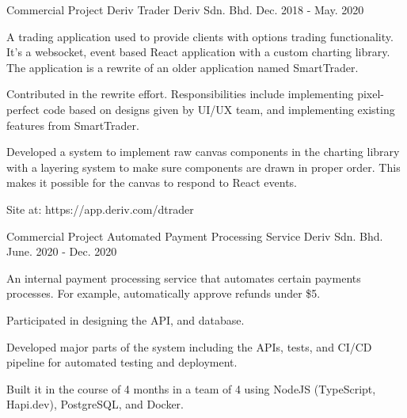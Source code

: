 

\begin{cventries}

  \cventry
    {Commercial Project} %
    {Deriv Trader} %
    {Deriv Sdn. Bhd.} %
    {Dec. 2018 - May. 2020} %
    {
      \begin{cvitems} %
        \item {A trading application used to provide clients with options trading functionality. It's a websocket, event based React application with a custom charting library. The application is a rewrite of an older application named SmartTrader.}
        \item {Contributed in the rewrite effort. Responsibilities include implementing pixel-perfect code based on designs given by UI/UX team, and implementing existing features from SmartTrader.}
        \item {Developed a system to implement raw canvas components in the charting library with a layering system to make sure components are drawn in proper order. This makes it possible for the canvas to respond to React events.}
        \item {Site at: https://app.deriv.com/dtrader}
      \end{cvitems}
    }

  \cventry
    {Commercial Project} %
    {Automated Payment Processing Service} %
    {Deriv Sdn. Bhd.} %
    {June. 2020 - Dec. 2020} %
    {
      \begin{cvitems} %
        \item {An internal payment processing service that automates certain payments processes. For example, automatically approve refunds under \$5.}
        \item {Participated in designing the API, and database.}
        \item {Developed major parts of the system including the APIs, tests, and CI/CD pipeline for automated testing and deployment.}
        \item {Built it in the course of 4 months in a team of 4 using NodeJS (TypeScript, Hapi.dev), PostgreSQL, and Docker.}
      \end{cvitems}
    }


\end{cventries}
